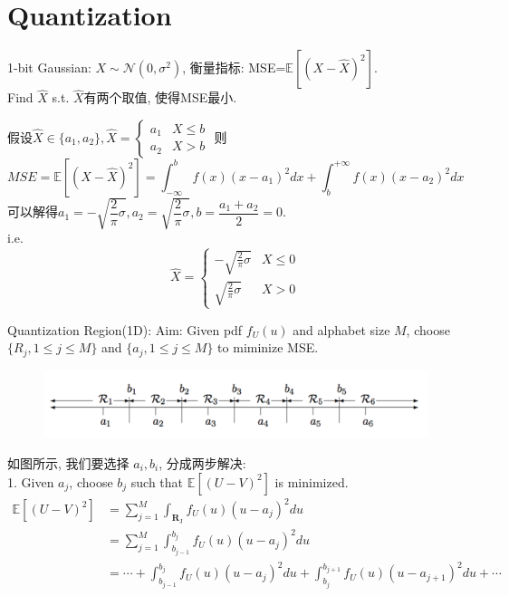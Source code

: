 \section{Quantization}
\begin{example}
1-bit Gaussian: $X\sim\mathcal{N}(0,\sigma^2)$, 衡量指标: MSE=$\mathbb{E}\left[(X-\hat{X})^2\right]$. \\
Find $\hat{X}$ s.t. $\hat{X}$有两个取值, 使得MSE最小.
\end{example}
假设$\hat{X}\in\{a_1,a_2\}, \hat{X}=\begin{cases}
    a_1 & X\leq b \\
    a_2 & X>b
\end{cases}$ 则
$$MSE=\mathbb{E}[(X-\hat{X})^2]=\int_{-\infty}^bf(x)(x-a_1)^2dx+\int_b^{+\infty}f(x)(x-a_2)^2dx$$
可以解得$a_1=-\sqrt{\dfrac{2}{\pi}\sigma}, a_2=\sqrt{\dfrac{2}{\pi}\sigma}, b=\dfrac{a_1+a_2}{2}=0$. \\
i.e.
$$\hat{X}=\begin{cases}
    -\sqrt{\frac{2}{\pi}\sigma} & X\leq 0 \\
    \sqrt{\frac{2}{\pi}\sigma} & X>0
\end{cases}$$


\begin{example}
Quantization Region(1D): Aim: Given pdf $f_U(u)$ and alphabet size $M$, choose $\{R_j, 1\leq j\leq M\}$ and $\{a_j, 1\leq j\leq M\}$ to miminize MSE.
\begin{figure}[htbp]
    \centering
    \includegraphics[width=\textwidth]{./figures/chapter8/1D_quantization.png}
\end{figure}
\end{example}
如图所示, 我们要选择 $a_i, b_i$, 分成两步解决: \\
1. Given $a_j$, choose $b_j$ such that $\mathbb{E}\left[(U-V)^2\right]$ is minimized.
\begin{align*}
\mathbb{E}\left[(U-V)^2\right] &= \sum_{j=1}^M \int_{\mathbf{R}_{\mathrm{J}}} f_U(u)\left(u-a_j\right)^2 d u \\
&= \sum_{j=1}^M \int_{b_{j-1}}^{b_j} f_U(u)\left(u-a_j\right)^2 d u \\
&= \cdots+\int_{b_{j-1}}^{b_j} f_U(u)\left(u-a_j\right)^2 d u+\int_{b_j}^{b_{j+1}} f_U(u)\left(u-a_{j+1}\right)^2 d u+\cdots
\end{align*}

